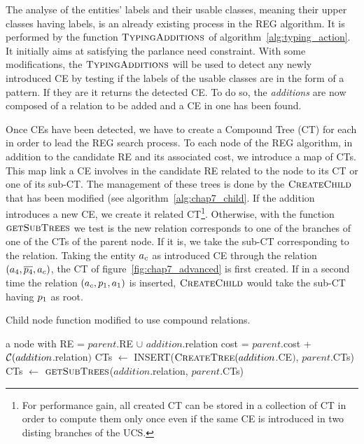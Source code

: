 The analyse of the entities' labels and their usable classes, meaning their upper classes having labels, is an already existing process in the REG algorithm. It is performed by the function $\textsc{TypingAdditions}$ of algorithm~\ref{alg:typing_action}. It initially aims at satisfying the parlance need constraint. With some modifications, the $\textsc{TypingAdditions}$ will be used to detect any newly introduced CE by testing if the labels of the usable classes are in the form of a pattern. If they are it returns the detected CE. To do so, the \textit{additions} are now composed of a relation to be added and a CE in one has been found.

Once CEs have been detected, we have to create a Compound Tree (CT) for each in order to lead the REG search process. To each node of the REG algorithm, in addition to the candidate RE and its associated cost, we introduce a map of CTs. This map link a CE involves in the candidate RE related to the node to its CT or one of its sub-CT. The management of these trees is done by the $\textsc{CreateChild}$ that has been modified (see algorithm~\ref{alg:chap7_child}. If the addition introduces a new CE, we create it related CT\footnote{For performance gain, all created CT can be stored in a collection of CT in order to compute them only once even if the same CE is introduced in two disting branches of the UCS.}. Otherwise, with the function $\textsc{getSubTrees}$ we test is the new relation corresponds to one of the branches of one of the CTs of the parent node. If it is, we take the sub-CT corresponding to the relation. Taking the entity $a_c$ as introduced CE through the relation $(a_4, \overline{p_4}, a_c)$, the CT of figure~\ref{fig:chap7_advanced} is first created. If in a second time the relation $(a_c, p_1, a_1)$ is inserted, $\textsc{CreateChild}$ would take the sub-CT having $p_1$ as root.

\begin{algorithm}[H]
\caption{\label{alg:chap7_child} Child node function modified to use compound relations.}
\begin{algorithmic}
    \State \Return a node with
    \State RE = $parent$.RE $\cup$ $addition$.relation
    \State cost = $parent$.cost + $\mathcal{C}(addition$.relation$)$
    	\State CTs $\leftarrow$ INSERT($\textsc{CreateTree}(addition$.CE$)$, $parent$.CTs)
    \Else
    	\State CTs $\leftarrow$ $\textsc{getSubTrees}$($addition$.relation, $parent$.CTs)
    \EndIf
\EndFunction
\end{algorithmic}
\end{algorithm}

